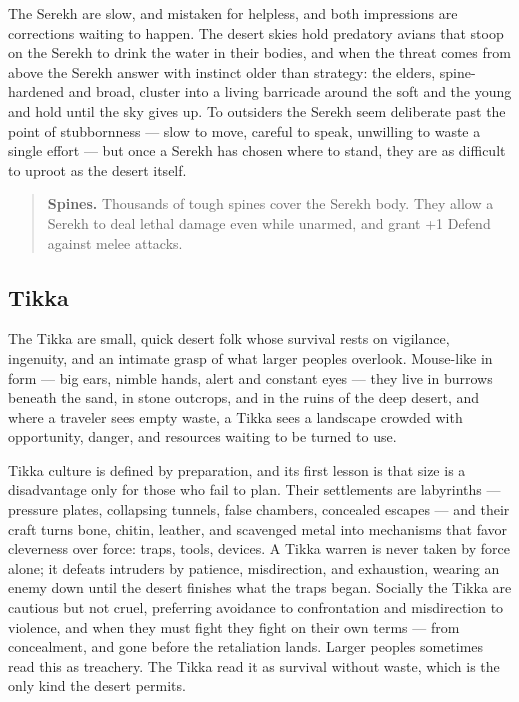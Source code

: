 The Serekh are slow, and mistaken for helpless, and both impressions are corrections waiting to happen. The desert skies hold predatory avians that stoop on the Serekh to drink the water in their bodies, and when the threat comes from above the Serekh answer with instinct older than strategy: the elders, spine-hardened and broad, cluster into a living barricade around the soft and the young and hold until the sky gives up. To outsiders the Serekh seem deliberate past the point of stubbornness --- slow to move, careful to speak, unwilling to waste a single effort --- but once a Serekh has chosen where to stand, they are as difficult to uproot as the desert itself.

\begin{quote}
\textbf{Spines.} Thousands of tough spines cover the Serekh body. They allow a Serekh to deal lethal damage even while unarmed, and grant +1 Defend against melee attacks.
\end{quote}

\subsection{Tikka}

The Tikka are small, quick desert folk whose survival rests on vigilance, ingenuity, and an intimate grasp of what larger peoples overlook. Mouse-like in form --- big ears, nimble hands, alert and constant eyes --- they live in burrows beneath the sand, in stone outcrops, and in the ruins of the deep desert, and where a traveler sees empty waste, a Tikka sees a landscape crowded with opportunity, danger, and resources waiting to be turned to use.

Tikka culture is defined by preparation, and its first lesson is that size is a disadvantage only for those who fail to plan. Their settlements are labyrinths --- pressure plates, collapsing tunnels, false chambers, concealed escapes --- and their craft turns bone, chitin, leather, and scavenged metal into mechanisms that favor cleverness over force: traps, tools, devices. A Tikka warren is never taken by force alone; it defeats intruders by patience, misdirection, and exhaustion, wearing an enemy down until the desert finishes what the traps began. Socially the Tikka are cautious but not cruel, preferring avoidance to confrontation and misdirection to violence, and when they must fight they fight on their own terms --- from concealment, and gone before the retaliation lands. Larger peoples sometimes read this as treachery. The Tikka read it as survival without waste, which is the only kind the desert permits.

